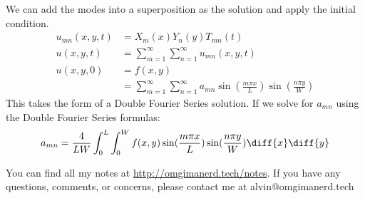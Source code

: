 \documentclass{math}
\begin{document}
We can add the modes into a superposition as the solution and apply the
initial condition.
\begin{align*}
  u_{mn}(x,y,t) &= X_m(x)Y_n(y)T_{mn}(t) \\
  u(x,y,t) &= \sum_{m=1}^{\infty}\sum_{n=1}^{\infty}u_{mn}(x,y,t) \\
  u(x,y,0) &= f(x,y) \\
  &= \sum_{m=1}^{\infty}\sum_{n=1}^{\infty}a_{mn}
    \sin(\frac{m\pi x}{L})\sin(\frac{n\pi y}{W})
\end{align*}
This takes the form of a Double Fourier Series solution. If we solve for
\( a_{mn} \) using the Double Fourier Series formulas:
\[ a_{mn} = \frac{4}{LW}\int_{0}^{L}\int_{0}^{W}f(x,y)\sin(\frac{m\pi x}{L})
  \sin(\frac{n\pi y}{W})\diff{x}\diff{y} \]

\begin{center}
  You can find all my notes at \url{http://omgimanerd.tech/notes}. If you have
  any questions, comments, or concerns, please contact me at
  alvin@omgimanerd.tech
\end{center}
\end{document}
